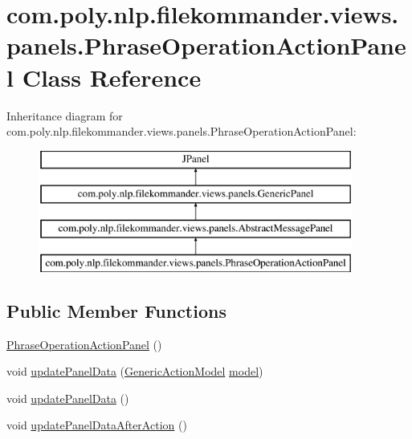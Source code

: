 \hypertarget{classcom_1_1poly_1_1nlp_1_1filekommander_1_1views_1_1panels_1_1_phrase_operation_action_panel}{\section{com.\-poly.\-nlp.\-filekommander.\-views.\-panels.\-Phrase\-Operation\-Action\-Panel Class Reference}
\label{classcom_1_1poly_1_1nlp_1_1filekommander_1_1views_1_1panels_1_1_phrase_operation_action_panel}
}
Inheritance diagram for com.\-poly.\-nlp.\-filekommander.\-views.\-panels.\-Phrase\-Operation\-Action\-Panel\-:\begin{figure}[H]
\begin{center}
\leavevmode
\includegraphics[height=4.000000cm]{classcom_1_1poly_1_1nlp_1_1filekommander_1_1views_1_1panels_1_1_phrase_operation_action_panel}
\end{center}
\end{figure}
\subsection*{Public Member Functions}
\begin{DoxyCompactItemize}
\item 
\hyperlink{classcom_1_1poly_1_1nlp_1_1filekommander_1_1views_1_1panels_1_1_phrase_operation_action_panel_a2ab6b6a6d9e3bbe63370609483295c51}{Phrase\-Operation\-Action\-Panel} ()
\item 
void \hyperlink{classcom_1_1poly_1_1nlp_1_1filekommander_1_1views_1_1panels_1_1_phrase_operation_action_panel_a59320d2ae9d4c2cb7502792403341d2a}{update\-Panel\-Data} (\hyperlink{interfacecom_1_1poly_1_1nlp_1_1filekommander_1_1views_1_1models_1_1_generic_action_model}{Generic\-Action\-Model} \hyperlink{classcom_1_1poly_1_1nlp_1_1filekommander_1_1views_1_1panels_1_1_phrase_operation_action_panel_ac8380b5cb091933bcb138d4b7471d3c1}{model})
\item 
void \hyperlink{classcom_1_1poly_1_1nlp_1_1filekommander_1_1views_1_1panels_1_1_phrase_operation_action_panel_a2abe1380c317051f30cb7d17fbeef324}{update\-Panel\-Data} ()
\item 
void \hyperlink{classcom_1_1poly_1_1nlp_1_1filekommander_1_1views_1_1panels_1_1_phrase_operation_action_panel_a602dc045881eb866cc9bebbb5b925a00}{update\-Panel\-Data\-After\-Action} ()
\end{DoxyCompactItemize}
